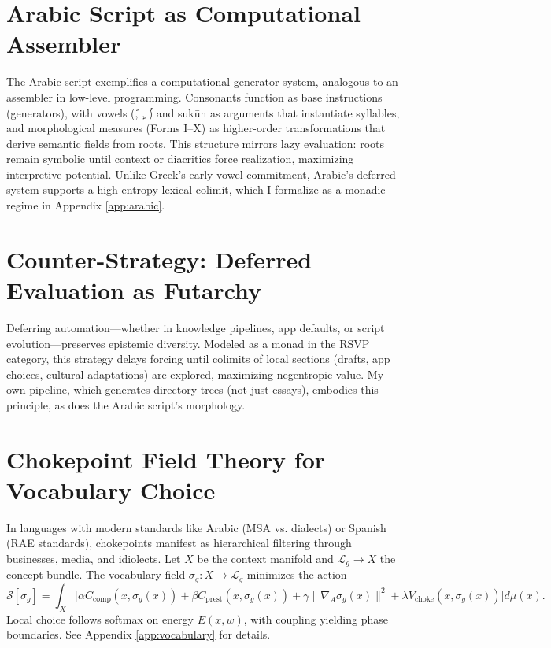 \documentclass[12pt]{article}
\theoremstyle{remark}
\newcommand{\fatha}{\textarabic{َ}}
\newcommand{\kasra}{\textarabic{ِ}}
\newcommand{\damma}{\textarabic{ُ}}
\begin{document}
\section{Arabic Script as Computational Assembler}
\label{sec:arabicassembler}
The Arabic script exemplifies a computational generator system, analogous to an assembler in low-level programming. Consonants function as base instructions (generators), with vowels (\fatha, \kasra, \damma) and sukūn as arguments that instantiate syllables, and morphological measures (Forms I–X) as higher-order transformations that derive semantic fields from roots. This structure mirrors lazy evaluation: roots remain symbolic until context or diacritics force realization, maximizing interpretive potential. Unlike Greek’s early vowel commitment, Arabic’s deferred system supports a high-entropy lexical colimit, which I formalize as a monadic regime in Appendix \ref{app:arabic}.

\section{Counter-Strategy: Deferred Evaluation as Futarchy}
Deferring automation—whether in knowledge pipelines, app defaults, or script evolution—preserves epistemic diversity. Modeled as a monad in the RSVP category, this strategy delays forcing until colimits of local sections (drafts, app choices, cultural adaptations) are explored, maximizing negentropic value. My own pipeline, which generates directory trees (not just essays), embodies this principle, as does the Arabic script’s morphology.

\section{Chokepoint Field Theory for Vocabulary Choice}
In languages with modern standards like Arabic (MSA vs. dialects) or Spanish (RAE standards), chokepoints manifest as hierarchical filtering through businesses, media, and idiolects. Let $X$ be the context manifold and $\mathcal{L}_g \to X$ the concept bundle. The vocabulary field $\sigma_g: X \to \mathcal{L}_g$ minimizes the action
\[
\mathcal{S}[\sigma_g] = \int_X \big[ \alpha C_{\text{comp}}(x,\sigma_g(x)) + \beta C_{\text{prest}}(x,\sigma_g(x)) + \gamma \|\nabla_A \sigma_g(x)\|^2 + \lambda V_{\text{choke}}(x,\sigma_g(x)) \big] d\mu(x).
\]
Local choice follows softmax on energy $E(x,w)$, with coupling yielding phase boundaries. See Appendix \ref{app:vocabulary} for details.
\end{document}
